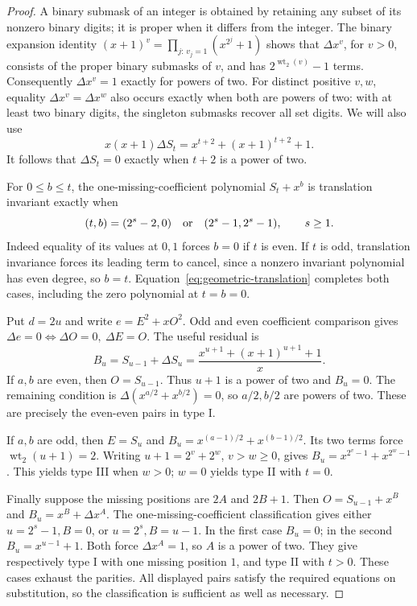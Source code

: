 \documentclass[11pt]{article}
\theoremstyle{definition}
\theoremstyle{remark}
\begin{document}
\begin{proof}
A binary submask of an integer is obtained by retaining any subset of
its nonzero binary digits; it is proper when it differs from the integer.
The binary expansion identity
$(x+1)^v=\prod_{j:\,v_j=1}(x^{2^j}+1)$ shows that
$\Delta x^v$, for $v>0$, consists of the proper binary submasks
of $v$, and has $2^{\operatorname{wt}_2(v)}-1$ terms.
Consequently $\Delta x^v=1$ exactly for powers of two.
For distinct positive $v,w$, equality $\Delta x^v=\Delta x^w$
also occurs exactly when both are powers of two: with at least
two binary digits, the singleton submasks recover all set digits.
We will also use
\begin{equation}\label{eq:geometric-translation}
 x(x+1)\Delta S_t=x^{t+2}+(x+1)^{t+2}+1.
\end{equation}
It follows that $\Delta S_t=0$ exactly when $t+2$ is a power of two.

For $0\le b\le t$, the one-missing-coefficient polynomial
$S_t+x^b$ is translation invariant exactly when
\[
 (t,b)=(2^s-2,0)\quad\hbox{or}\quad(2^s-1,2^s-1),\qquad s\ge1.
\]
Indeed equality of its values at $0,1$ forces $b=0$ if $t$ is even.
If $t$ is odd, translation invariance forces its leading term to
cancel, since a nonzero invariant polynomial has even degree, so
$b=t$. Equation~\eqref{eq:geometric-translation} completes both cases,
including the zero polynomial at $t=b=0$.

Put $d=2u$ and write $e=E^2+xO^2$.
Odd and even coefficient comparison gives
$\Delta e=0\Longleftrightarrow\Delta O=0,\ \Delta E=O$.
The useful residual is
\[
 B_u=S_{u-1}+\Delta S_u
     =\frac{x^{u+1}+(x+1)^{u+1}+1}{x}.
\]
If $a,b$ are even, then $O=S_{u-1}$. Thus $u+1$ is a power
of two and $B_u=0$. The remaining condition is
$\Delta(x^{a/2}+x^{b/2})=0$, so $a/2,b/2$ are powers of two.
These are precisely the even-even pairs in type I.

If $a,b$ are odd, then $E=S_u$ and
$B_u=x^{(a-1)/2}+x^{(b-1)/2}$. Its two terms force
$\operatorname{wt}_2(u+1)=2$. Writing $u+1=2^v+2^w$, $v>w\ge0$,
gives $B_u=x^{2^v-1}+x^{2^w-1}$. This yields type III when $w>0$;
$w=0$ yields type II with $t=0$.

Finally suppose the missing positions are $2A$ and $2B+1$.
Then $O=S_{u-1}+x^B$ and $B_u=x^B+\Delta x^A$.
The one-missing-coefficient classification gives either
$u=2^s-1,B=0$, or $u=2^s,B=u-1$.
In the first case $B_u=0$; in the second $B_u=x^{u-1}+1$.
Both force $\Delta x^A=1$, so $A$ is a power of two.
They give respectively type I with one missing position $1$,
and type II with $t>0$. These cases exhaust the parities.
All displayed pairs satisfy the required equations on substitution,
so the classification is sufficient as well as necessary.
\end{proof}
\end{document}
